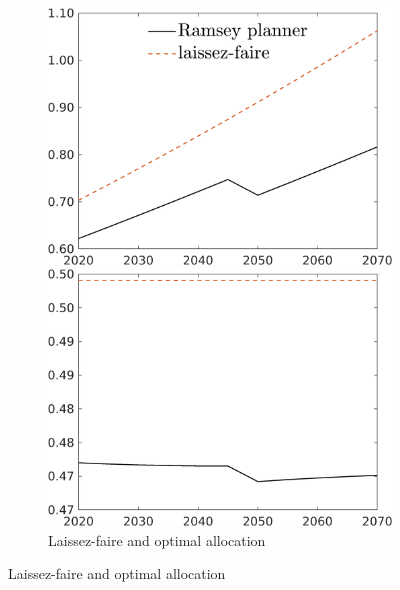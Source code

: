 \begin{figure}[h!!]
	\centering
	\caption{Allocations in levels }\label{fig:LF}	
	\begin{subfigure}{1\textwidth}		
		\caption{Laissez-faire and optimal allocation}
	\begin{minipage}[]{0.32\textwidth}
		\includegraphics[width=1\textwidth]{../../codding_model/own_basedOnFried/optimalPol_010922_revision/figures/all_13Sept22_Tplus30/C_LFCompOPT_T_NoTaus_regime0_spillover0_noskill0_sep0_xgrowth0_PV1_etaa0.79_lgd1.png}
	\end{minipage}	
	\begin{minipage}[]{0.32\textwidth}
	\includegraphics[width=1\textwidth]{../../codding_model/own_basedOnFried/optimalPol_010922_revision/figures/all_13Sept22_Tplus30/hh_LFCompOPT_T_NoTaus_regime0_spillover0_noskill0_sep0_xgrowth0_PV1_etaa0.79_lgd0.png}

\end{minipage}
\end{subfigure}
\end{figure}
